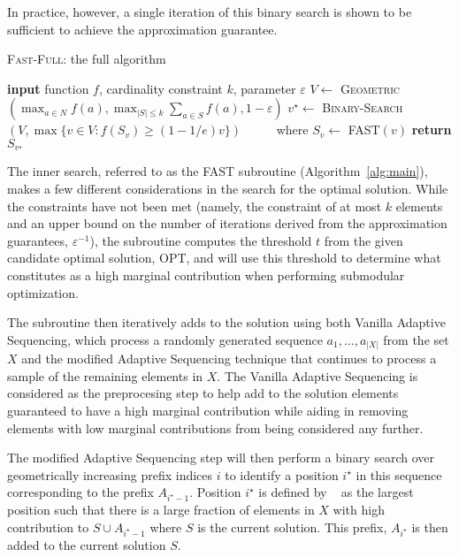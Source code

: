 \documentclass[11pt, a4paper]{article}
\begin{document}
In practice, however, a single iteration of this binary search is shown to be sufficient to achieve the approximation guarantee.

 
\begin{algorithm}[H]
\caption{\textsc{Fast-Full}: the full algorithm}
\begin{algorithmic}
    	\STATE \textbf{input} function $f$, cardinality constraint $k$, parameter $\varepsilon$
    	\STATE $V \leftarrow$ \textsc{Geometric}$(\max_{a \in N} f(a), \max_{|S| \leq k} \sum_{a \in S} f(a), 1 - \varepsilon)$
    	\STATE $v^{\star} \leftarrow$ \textsc{Binary-Search}$(V, \max\{v \in V: f(S_v) \geq (1 - 1/e)v\})$
    	\STATE \ \ \ \ \ where $S_v \leftarrow$ \textsc{FAST}$(v)$
    	\STATE \textbf{return} $S_{v^{\star}}$ 
  \end{algorithmic}
  \label{alg:fast-full}
\end{algorithm}

The inner search, referred to as the \textsc{FAST} subroutine (Algorithm~\ref{alg:main}), makes a few different considerations in the search for the optimal solution. While the constraints have not been met (namely, the constraint of at most $k$ elements and an upper bound on the number of iterations derived from the approximation guarantees, $\varepsilon^{-1}$), the subroutine computes the threshold $t$ from the given candidate optimal solution, OPT, and will use this threshold to determine what constitutes as a high marginal contribution when performing submodular optimization.

The subroutine then iteratively adds to the solution using both Vanilla Adaptive Sequencing, which process a randomly generated sequence $a_1, \ldots, a_{|X|}$ from the set $X$ and the modified Adaptive Sequencing technique that continues to process a sample of the remaining elements in $X$. The Vanilla Adaptive Sequencing is considered as the preprocesing step to help add to the solution elements guaranteed to have a high marginal contribution while aiding in removing elements with low marginal contributions from being considered any further.

The modified Adaptive Sequencing step will then perform a binary search over geometrically increasing prefix indices $i$ to identify a position $i^{\star}$ in this sequence corresponding to the prefix $A_{i^{\star} - 1}$. Position $i^{\star}$ is defined by ~\cite{breuer2019fast} as the largest position such that there is a large fraction of elements in $X$ with high contribution to $S \cup A_{i^{\star} - 1}$ where $S$ is the current solution. This prefix, $A_{i^{\star}}$ is then added to the current solution $S$.
\end{document}
